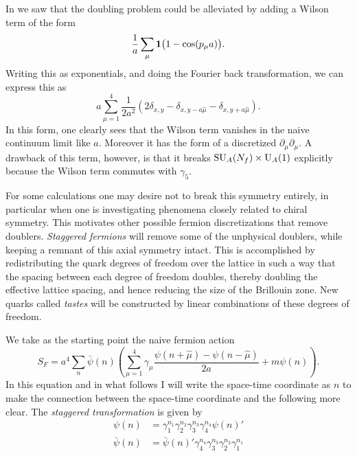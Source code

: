 In  we saw that the doubling problem could
be alleviated by adding a Wilson term of the form
\begin{equation}
  \frac{1}{a}\sum_\mu{\mathbf 1}\big(1-\cos(p_\mu a)\big).
\end{equation}
Writing this as exponentials, and doing the Fourier back transformation,
we can express this as
\begin{equation}
  a\sum_{\mu=1}^4\frac{1}{2a^2}
\left(2\delta_{x,y}-\delta_{x,y-a\hat{\mu}}-\delta_{x,y+a\hat{\mu}}\right).
\end{equation}
In this form, one clearly sees that the Wilson term vanishes in the
naive continuum limit like $a$. Moreover it has the form of a
discretized $\partial_\mu\partial_\mu$. A drawback of this term,
however, is that it breaks $\operatorname{SU}_A(N_f)\times\operatorname{U}_A(1)$ explicitly
because the Wilson term commutes with $\gamma_5$.

For some calculations one may desire not to break this symmetry entirely,
in particular when one is investigating phenomena closely related to
chiral symmetry. This motivates other possible fermion discretizations
that remove doublers. {\it Staggered fermions} will remove some of the 
unphysical doublers, while keeping a remnant of this axial symmetry intact. 
This is accomplished by redistributing the quark degrees of freedom over
the lattice in such a way that the spacing between each degree of freedom
doubles, thereby doubling the effective lattice spacing, and hence
reducing the size of the Brillouin zone. New quarks called {\it tastes}
will be constructed by linear combinations of these degrees of freedom.

We take as the starting point the naive fermion action
\begin{equation}
 S_F
     =a^4\sum_n\bar{\psi}(n)\left(\sum_{\mu=1}^4\gamma_\mu
       \frac{\psi(n+\hat{\mu})-\psi(n-\hat{\mu})}{2a}
       +m\psi(n)\right).
\end{equation}
In this equation and in what follows I will write the space-time coordinate
as $n$ to make the connection between the space-time coordinate and the
following more clear. The {\it staggered
transformation} is given by
\begin{equation}\begin{aligned}
\psi(n)&=\gamma_1^{n_1}\gamma_2^{n_2}\gamma_3^{n_3}\gamma_4^{n_4}\psi(n)'\\
\bar{\psi}(n)
   &=\bar{\psi}(n)'\gamma_4^{n_4}\gamma_3^{n_3}\gamma_2^{n_2}\gamma_1^{n_1}
\end{aligned}\end{equation}

